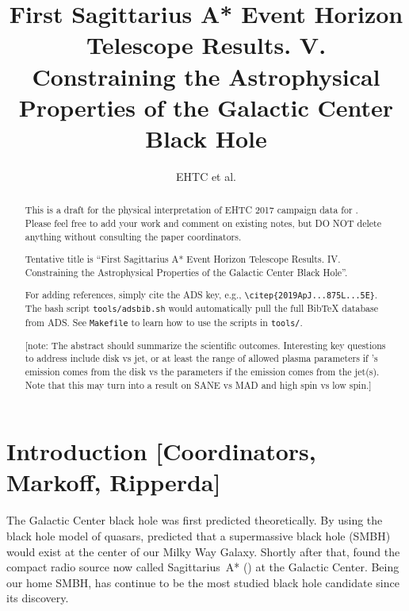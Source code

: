 \documentclass[twocolumn,tighten,dvipsnames,linenumbers]{aastex63}
\newcommand\note[1]{{\color{OliveGreen}[note: #1]}}
\begin{document}
\title{First Sagittarius A* Event Horizon Telescope Results. V.\\
  Constraining the Astrophysical Properties of the Galactic Center Black Hole}
\author{EHTC et al.}



\received{\today}
\revised{\today}

\begin{abstract}
  \color{BrickRed}

  This is a draft for the physical interpretation of EHTC 2017
  campaign data for \sgra.
  Please feel free to add your work and comment on existing notes, but
  DO NOT delete anything without consulting the paper coordinators.

  Tentative title is ``First Sagittarius A* Event Horizon Telescope
  Results. IV. Constraining the Astrophysical Properties of the
  Galactic Center Black Hole''.

  For adding references, simply cite the ADS key, e.g.,
  \texttt{\textbackslash citep\{2019ApJ...875L...5E\}}.
  The bash script \texttt{tools/adsbib.sh} would automatically pull
  the full BibTeX database from ADS.
  See \texttt{Makefile} to learn how to use the scripts in
  \texttt{tools/}.

  \note{The abstract should summarize the scientific outcomes.
    Interesting key questions to address include disk vs jet, or at
    least the range of allowed plasma parameters if \sgra's emission
    comes from the disk vs the parameters if the emission comes from
    the jet(s).
    Note that this may turn into a result on SANE vs MAD and high spin
    vs low spin.}
\end{abstract}


\tableofcontents

\section{Introduction
  [Coordinators, Markoff, Ripperda]}
\label{sec:intro}


The Galactic Center black hole was first predicted theoretically.
By using the black hole model of quasars, \citet{1971MNRAS.152..461L}
predicted that a supermassive black hole (SMBH) would exist at the
center of our Milky Way Galaxy.
Shortly after that, \citet{1974ApJ...194..265B, 1975A&A....43..159E,
  1975ApJ...202L..63L} found the compact radio source now called
Sagittarius~A* (\sgra) at the Galactic Center.
Being our home SMBH, \sgra has continue to be the most studied black
hole candidate since its discovery.
\end{document}
